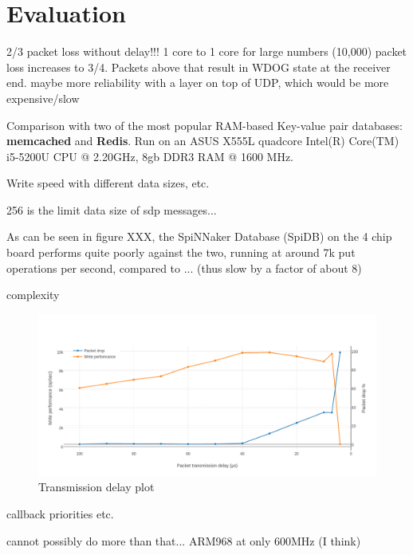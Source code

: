 \chapter{Evaluation}
\label{cha:eval}


2/3 packet loss without delay!!! 1 core to 1 core
for large numbers (10,000) packet loss increases to 3/4. Packets above that result in WDOG state at the receiver end.
maybe more reliability with a layer on top of UDP, which would be more expensive/slow


Comparison with two of the most popular RAM-based Key-value pair databases: \textbf{memcached} and \textbf{Redis}.
Run on an ASUS X555L quadcore Intel(R) Core(TM) i5-5200U CPU @ 2.20GHz, 8gb DDR3 RAM @ 1600 MHz.

Write speed with different data sizes, etc.

256 is the limit data size of sdp messages...

As can be seen in figure XXX, the SpiNNaker Database (SpiDB) on the 4 chip board performs quite poorly against the two, running at around 7k put operations per second, compared to ... (thus slow by a factor of about 8) 

complexity


\begin{figure}
\begin{center}
	\includegraphics[width=1.4\textwidth, natwidth=1063, natheight=509]{images/transmission_delay.png}
\end{center}
\caption{Transmission delay plot}
\label{fig:transmission-delay}
\end{figure}





callback priorities etc.

cannot possibly do more than that...
ARM968 at only 600MHz (I think)


